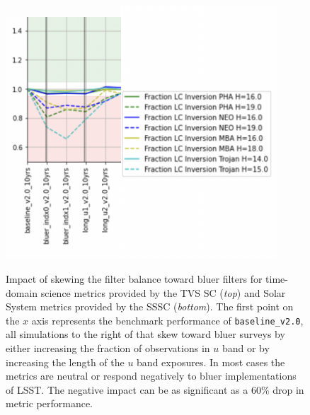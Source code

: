 \begin{figure}
    \includegraphics[width=1.7in]{figures/Filter_1.png}\includegraphics[width=2.3in]{figures/Filter2_Label.png}
    \caption{Impact of skewing the filter balance toward bluer filters for time-domain science metrics provided by the TVS SC (\emph{top}) and Solar System metrics provided by the SSSC (\emph{bottom}). The first point on the $x$ axis represents the benchmark performance of \texttt{baseline\_v2.0}, all simulations to the right of that skew toward bluer surveys by either increasing the fraction of observations in $u$ band or by increasing the length of the $u$ band exposures. In most cases the metrics are neutral or respond negatively to bluer implementations of LSST. The negative impact can be as significant as a 60\% drop in metric performance.}\label{fig:filterF1}
\end{figure}
